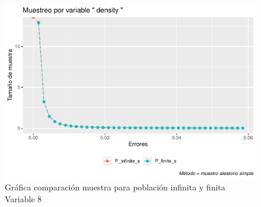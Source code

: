 \documentclass[
]{article}
\begin{document}
\begin{figure}
\centering
\includegraphics{1_examen_solucion_files/figure-latex/grafica va8-1.pdf}
\caption{Gráfica comparación muestra para población infinita y finita
Variable 8}
\end{figure}
\end{document}
